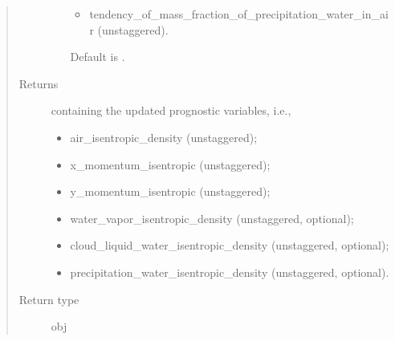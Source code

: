 \documentclass[letterpaper,10pt,english]{sphinxmanual}
\begin{document}
\begin{fulllineitems}
\begin{fulllineitems}
\begin{quote}
\begin{description}
\begin{itemize}
\begin{itemize}
\item {} 
tendency\_of\_mass\_fraction\_of\_precipitation\_water\_in\_air (unstaggered).

\end{itemize}

Default is .


\end{itemize}

\item[{Returns}] \leavevmode

{\hyperref[\detokenize{api:storages.state_isentropic.StateIsentropic}]{}} containing the updated prognostic variables, i.e.,
\begin{itemize}
\item {} 
air\_isentropic\_density (unstaggered);

\item {} 
x\_momentum\_isentropic (unstaggered);

\item {} 
y\_momentum\_isentropic (unstaggered);

\item {} 
water\_vapor\_isentropic\_density (unstaggered, optional);

\item {} 
cloud\_liquid\_water\_isentropic\_density (unstaggered, optional);

\item {} 
precipitation\_water\_isentropic\_density (unstaggered, optional).

\end{itemize}


\item[{Return type}] \leavevmode
obj

\end{description}\end{quote}

\end{fulllineitems}


\end{fulllineitems}

\end{document}
